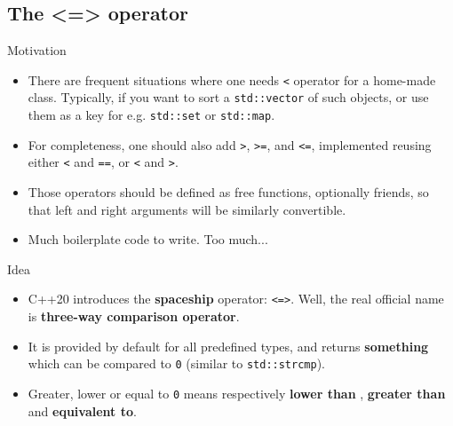 \subsection[spaceship]{The <=> operator}

\begin{frame}[fragile]
  \begin{block}{Motivation}
    \begin{itemize}
    \item There are frequent situations where one needs \texttt{<} operator for a home-made class. Typically, if you want to sort a \texttt{std::vector} of such objects, or use them as a key for e.g. \texttt{std::set} or \texttt{std::map}.
    \item For completeness, one should also add \texttt{>}, \texttt{>=}, and \texttt{<=}, implemented reusing either \texttt{<} and \texttt{==}, or \texttt{<} and \texttt{>}.
    \item Those operators should be defined as free functions, optionally friends, so that left and right arguments will be similarly convertible.
    \item Much boilerplate code to write. Too much...
    \end{itemize}
  \end{block}
\end{frame}

\begin{frame}[fragile]
  \begin{block}{Idea}
    \begin{itemize}
    \item C++20 introduces the \textbf{spaceship} operator: \texttt{<=>}. Well, the real official name is \textbf{three-way comparison operator}.
    \item It is provided by default for all predefined types, and returns \textbf{something} which can be compared to \texttt{0} (similar to \texttt{std::strcmp}).
    \item Greater, lower or equal to \texttt{0} means respectively \textbf{lower than} , \textbf{greater than} and \textbf{equivalent to}.
    \end{itemize}
  \end{block}
\end{frame}

